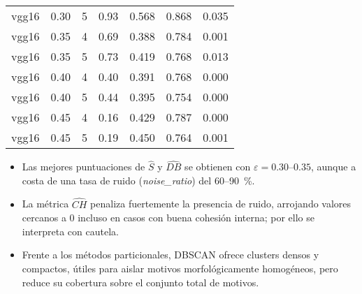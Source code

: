 \begin{longtable}{lrrrrrr}
      vgg16 & 0.30 &            5 &         0.93 &            0.568 &   0.868 &    0.035 \\
      vgg16 & 0.35 &            4 &         0.69 &            0.388 &   0.784 &    0.001 \\
      vgg16 & 0.35 &            5 &         0.73 &            0.419 &   0.768 &    0.013 \\
      vgg16 & 0.40 &            4 &         0.40 &            0.391 &   0.768 &    0.000 \\
      vgg16 & 0.40 &            5 &         0.44 &            0.395 &   0.754 &    0.000 \\
      vgg16 & 0.45 &            4 &         0.16 &            0.429 &   0.787 &    0.000 \\
      vgg16 & 0.45 &            5 &         0.19 &            0.450 &   0.764 &    0.001 \\
\end{longtable}

\begin{itemize}
  \item Las mejores puntuaciones de \(\widehat S\) y \(\widehat{DB}\) se obtienen con \(\varepsilon=0.30\)–\(0.35\), aunque a costa de una tasa de ruido (\textit{noise\_ratio}) del 60--90~\%.
  \item La métrica \(\widehat{CH}\) penaliza fuertemente la presencia de ruido, arrojando valores cercanos a \(0\) incluso en casos con buena cohesión interna; por ello se interpreta con cautela.
  \item Frente a los métodos particionales, DBSCAN ofrece clusters densos y compactos, útiles para aislar motivos morfológicamente homogéneos, pero reduce su cobertura sobre el conjunto total de motivos.
\end{itemize}

